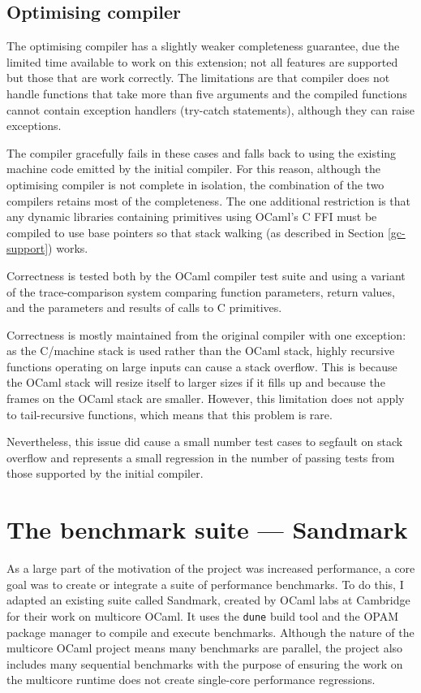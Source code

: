 \subsection{Optimising compiler} \label{eval-opt-comp-qual}

The optimising compiler has a slightly weaker completeness guarantee, due the limited time
available to work on this extension; not all features are supported but those that are work
correctly. The limitations are that compiler does not handle functions that take more than five
arguments and the compiled functions cannot contain exception handlers (try-catch statements),
although they can raise exceptions.

The compiler gracefully fails in these cases and falls back to using the existing machine code
emitted by the initial compiler. For this reason, although the optimising compiler is not complete
in isolation, the combination of the two compilers retains most of the completeness. The one
additional restriction is that any dynamic libraries containing primitives using OCaml's C FFI must
be compiled to use base pointers so that stack walking (as described in Section
\ref{gc-support}) works.

Correctness is tested both by the OCaml compiler test suite and using a variant of the
trace-comparison system comparing function parameters, return values, and the parameters and
results of calls to C primitives.

Correctness is mostly maintained from the original compiler with one exception: as the C/machine
stack is used rather than the OCaml stack, highly recursive functions operating on large inputs can
cause a stack overflow. This is because the OCaml stack will resize itself to larger sizes if it
fills up and because the frames on the OCaml stack are smaller.  However, this limitation does not
apply to tail-recursive functions, which means that this problem is rare.

Nevertheless, this issue did cause a small number test cases to segfault on stack overflow and
represents a small regression in the number of passing tests from those supported by the initial
compiler.

\section{The benchmark suite --- Sandmark}

As a large part of the motivation of the project was increased performance, a core goal was to
create or integrate a suite of performance benchmarks. To do this, I adapted an existing suite
called Sandmark, created by OCaml labs at Cambridge for their work on
multicore OCaml. It uses the \texttt{dune} build tool and the OPAM package manager to compile and
execute benchmarks.
Although the nature of the multicore OCaml project means many benchmarks are parallel, the project
also includes many sequential benchmarks with the purpose of ensuring the work on the multicore
runtime does not create single-core performance regressions.


